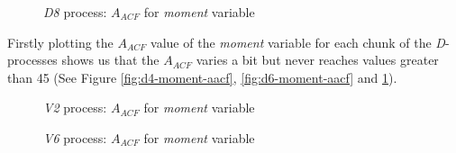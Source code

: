 \documentclass[12 pt]{scrartcl}
\begin{document}
\begin{figure}[p]
  \caption{\emph{D8} process: $A_{ACF}$ for \emph{moment} variable}
  \label{fig:d8-moment-aacf}
\end{figure}

Firstly plotting the $A_{ACF}$ value of the \emph{moment} variable for each chunk of the \emph{D}-processes shows us that the $A_{ACF}$ varies a bit but never reaches values greater than 45 (See Figure \ref{fig:d4-moment-aacf}, \ref{fig:d6-moment-aacf} and \ref{fig:d8-moment-aacf}).



\begin{figure}[p]
  \caption{\emph{V2} process: $A_{ACF}$ for \emph{moment} variable}
  \label{fig:v2-moment-aacf}
\end{figure}



\begin{figure}[p]
  \caption{\emph{V6} process: $A_{ACF}$ for \emph{moment} variable}
  \label{fig:v6-moment-aacf}
\end{figure}
\end{document}
